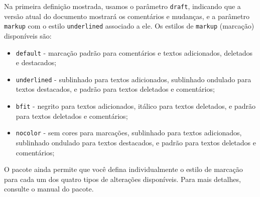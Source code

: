 Na primeira definição mostrada, usamos o parâmetro \texttt{draft}, indicando que a versão atual do documento mostrará os comentários e mudanças, e a parâmetro \texttt{markup} com o estilo \texttt{underlined} associado a ele. Os estilos de \texttt{markup} (marcação) disponíveis são: 

\begin{itemize}
	\item \texttt{default} - marcação padrão para comentários e textos adicionados, deletados e destacados;
	\item \texttt{underlined} - sublinhado para textos adicionados, sublinhado ondulado para textos destacados, e padrão para textos deletados e comentários;
	\item \texttt{bfit} - negrito para textos adicionados, itálico para textos deletados, e padrão para textos deletados e comentários;
	\item \texttt{nocolor} - sem cores para marcações, sublinhado para textos adicionados, sublinhado ondulado para textos destacados, e padrão para textos deletados e comentários;
\end{itemize}

O pacote ainda permite que você defina individualmente o estilo de marcação para cada um dos quatro tipos de alterações disponíveis. Para mais detalhes, consulte o manual do pacote. 

